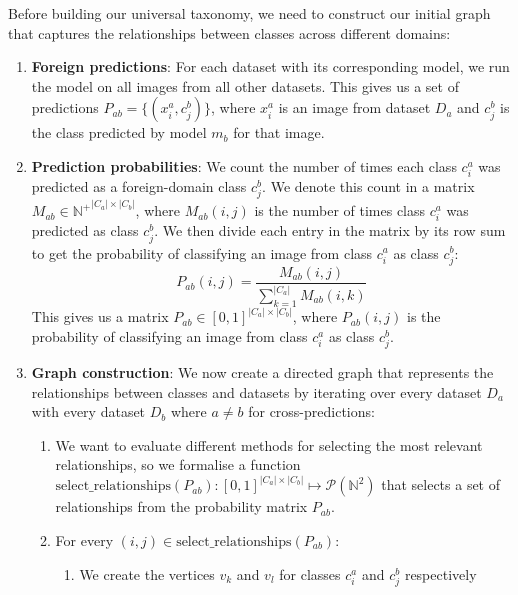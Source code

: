 Before building our universal taxonomy,
we need to construct our initial graph that captures the relationships between classes across different domains:

\begin{enumerate}
    \item \textbf{Foreign predictions}: For each dataset with its corresponding model,
          we run the model on all images from all other datasets.
          This gives us a set of predictions $P_{ab} = \{(x_i^a, c_j^b)\}$,
          where $x_i^a$ is an image from dataset $D_a$ and $c_j^b$ is the class
          predicted by model $m_b$ for that image.
    \item \textbf{Prediction probabilities}: We count the number of times each class $c_i^a$ was predicted
          as a foreign-domain class $c_j^b$.
          We denote this count in a matrix $M_{ab}\in {\mathbb{N}^+}^{|C_a| \times |C_b|}$,
          where $M_{ab}(i, j)$ is the number of times class $c_i^a$ was predicted
          as class $c_j^b$.
          We then divide each entry in the matrix by its row sum to get the
          probability of classifying an image from class $c_i^a$ as class $c_j^b$:
          \begin{equation*}
              P_{ab}(i, j) = \frac{M_{ab}(i, j)}{\sum_{k=1}^{|C_a|} M_{ab}(i, k)}
          \end{equation*}
          This gives us a matrix $P_{ab}\in [0, 1]^{|C_a| \times |C_b|}$,
          where $P_{ab}(i, j)$ is the probability of classifying an image from class $c_i^a$
          as class $c_j^b$.
    \item \textbf{Graph construction}: We now create a directed graph that represents the relationships between classes and datasets
          by iterating over every dataset $D_a$ with every dataset $D_b$ where $a \neq b$ for cross-predictions:
          \begin{enumerate}
              \item We want to evaluate different methods for selecting the most relevant relationships,
                    so we formalise a function $\text{select\_relationships}(P_{ab}): [0, 1]^{|C_a| \times |C_b|} \mapsto \mathcal{P}(\mathbb{N}^2)$
                    that selects a set of relationships from the probability matrix $P_{ab}$.
              \item For every $(i, j) \in \text{select\_relationships}(P_{ab})$:
                    \begin{enumerate}
                        \item We create the vertices $v_k$ and $v_l$ for classes $c_i^a$ and $c_j^b$ respectively

\end{enumerate}
\end{enumerate}
\end{enumerate}
